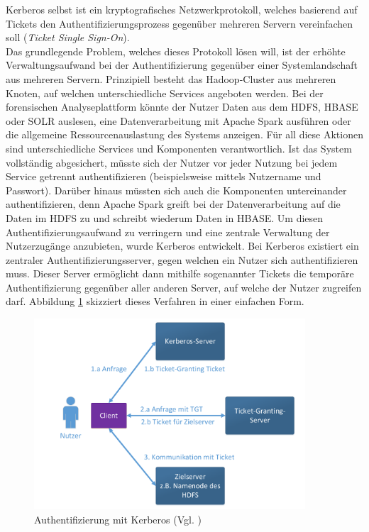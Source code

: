 \noindent
Kerberos selbst ist ein kryptografisches Netzwerkprotokoll, welches basierend auf Tickets den Authentifizierungsprozess gegenüber mehreren Servern vereinfachen soll (\textit{Ticket Single Sign-On}).\cite[S. 425-429]{crypto}\\
Das grundlegende Problem, welches dieses Protokoll lösen will, ist der erhöhte Verwaltungsaufwand bei der Authentifizierung gegenüber einer Systemlandschaft aus mehreren Servern. Prinzipiell besteht das Hadoop-Cluster aus mehreren Knoten, auf welchen unterschiedliche Services angeboten werden. Bei der forensischen Analyseplattform könnte der Nutzer Daten aus dem HDFS, HBASE oder SOLR auslesen, eine Datenverarbeitung mit Apache Spark ausführen oder die allgemeine Ressourcenauslastung des Systems anzeigen. Für all diese Aktionen sind unterschiedliche Services und Komponenten verantwortlich. Ist das System vollständig abgesichert, müsste sich der Nutzer vor jeder Nutzung bei jedem Service getrennt authentifizieren (beispielsweise mittels Nutzername und Passwort). Darüber hinaus müssten sich auch die Komponenten untereinander authentifizieren, denn Apache Spark greift bei der Datenverarbeitung auf die Daten im HDFS zu und schreibt wiederum Daten in HBASE. Um diesen Authentifizierungsaufwand zu verringern und eine zentrale Verwaltung der Nutzerzugänge anzubieten, wurde Kerberos entwickelt. 
Bei Kerberos existiert ein zentraler Authentifizierungsserver, gegen welchen ein Nutzer sich authentifizieren muss. Dieser Server ermöglicht dann mithilfe sogenannter Tickets die temporäre Authentifizierung gegenüber aller anderen Server, auf welche der Nutzer zugreifen darf.\cite[S. 425-429]{crypto} Abbildung \ref{fig:kerberos} skizziert dieses Verfahren in einer einfachen Form. 
\begin{figure}[ht]
  \centering
  \includegraphics[width=0.9\textwidth]{./resource/kerberos_authentification.pdf}
  \caption{Authentifizierung mit Kerberos (Vgl. \cite[S.426]{crypto})}
  \label{fig:kerberos}
\end{figure}

